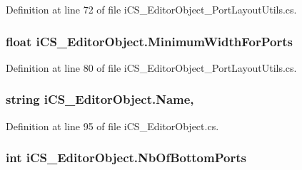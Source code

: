 Definition at line 72 of file i\+C\+S\+\_\+\+Editor\+Object\+\_\+\+Port\+Layout\+Utils.\+cs.

\hypertarget{classi_c_s___editor_object_a846fbfb791a69fa44e568c6b2eb8086c}{
\subsubsection[{Minimum\+Width\+For\+Ports}]{\setlength{\rightskip}{0pt plus 5cm}float i\+C\+S\+\_\+\+Editor\+Object.\+Minimum\+Width\+For\+Ports\hspace{0.3cm}{\ttfamily [get]}}}\label{classi_c_s___editor_object_a846fbfb791a69fa44e568c6b2eb8086c}


Definition at line 80 of file i\+C\+S\+\_\+\+Editor\+Object\+\_\+\+Port\+Layout\+Utils.\+cs.

\hypertarget{classi_c_s___editor_object_a8e4c031a5a6bae5851c370cce4b92f87}{
\subsubsection[{Name}]{\setlength{\rightskip}{0pt plus 5cm}string i\+C\+S\+\_\+\+Editor\+Object.\+Name\hspace{0.3cm}{\ttfamily [get]}, {\ttfamily [set]}}}\label{classi_c_s___editor_object_a8e4c031a5a6bae5851c370cce4b92f87}


Definition at line 95 of file i\+C\+S\+\_\+\+Editor\+Object.\+cs.

\hypertarget{classi_c_s___editor_object_ab0a26ec94fb2447f80d4e08e4bb5e3d1}{
\subsubsection[{Nb\+Of\+Bottom\+Ports}]{\setlength{\rightskip}{0pt plus 5cm}int i\+C\+S\+\_\+\+Editor\+Object.\+Nb\+Of\+Bottom\+Ports\hspace{0.3cm}{\ttfamily [get]}}}\label{classi_c_s___editor_object_ab0a26ec94fb2447f80d4e08e4bb5e3d1}


